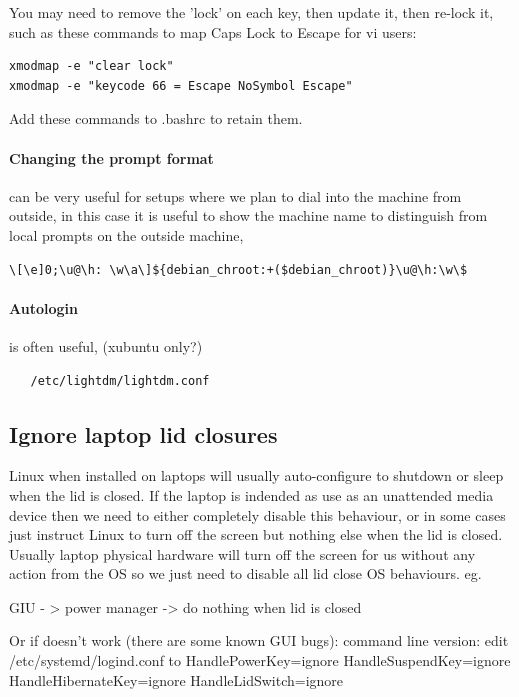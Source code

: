 \documentclass[oneside,english]{scrbook}
\begin{document}
You may need to remove the 'lock' on each key, then update it, then re-lock it, such as these commands to map Caps Lock to Escape for vi users:

\begin{lstlisting}
xmodmap -e "clear lock"
xmodmap -e "keycode 66 = Escape NoSymbol Escape"
\end{lstlisting}

Add these commands to .bashrc to retain them.


\paragraph{Changing the prompt format} can be very useful for setups where we plan to dial into the machine from outside, in this case it is useful to show the machine name to distinguish from local prompts on the outside machine,
\begin{lstlisting}
\[\e]0;\u@\h: \w\a\]${debian_chroot:+($debian_chroot)}\u@\h:\w\$
\end{lstlisting}

\paragraph{Autologin} is often useful, (xubuntu only?)
\begin{lstlisting}
   /etc/lightdm/lightdm.conf
\end{lstlisting}

\subsection{Ignore laptop lid closures}
Linux when installed on laptops will usually auto-configure to shutdown or sleep when the lid is closed.  If the laptop is indended as use as an unattended media device then we need to either completely disable this behaviour, or in some cases just instruct Linux to turn off the screen but nothing else when the lid is closed.  Usually laptop physical hardware will turn off the screen for us without any action from the OS so we just need to disable all lid close OS behaviours. eg.

        GIU - >  power manager -> do nothing when lid is closed

Or if doesn't work (there are some known GUI bugs): command line version:  edit /etc/systemd/logind.conf to
                        HandlePowerKey=ignore
                        HandleSuspendKey=ignore
                        HandleHibernateKey=ignore
                        HandleLidSwitch=ignore
                
\end{document}
